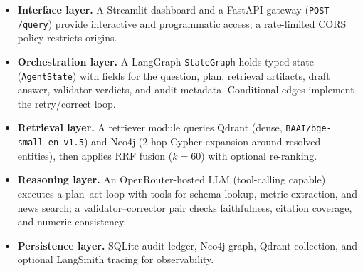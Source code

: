 \documentclass[conference]{IEEEtran}
\begin{document}
\begin{itemize}
\item \textbf{Interface layer.} A Streamlit dashboard and a FastAPI gateway (\texttt{POST /query}) provide interactive and programmatic access; a rate-limited CORS policy restricts origins.
\item \textbf{Orchestration layer.} A LangGraph \texttt{StateGraph} holds typed state (\texttt{AgentState}) with fields for the question, plan, retrieval artifacts, draft answer, validator verdicts, and audit metadata. Conditional edges implement the retry/correct loop.
\item \textbf{Retrieval layer.} A retriever module queries Qdrant (dense, \texttt{BAAI/bge-small-en-v1.5}) and Neo4j (2-hop Cypher expansion around resolved entities), then applies RRF fusion ($k{=}60$) with optional re-ranking.
\item \textbf{Reasoning layer.} An OpenRouter-hosted LLM (tool-calling capable) executes a plan--act loop with tools for schema lookup, metric extraction, and news search; a validator--corrector pair checks faithfulness, citation coverage, and numeric consistency.
\item \textbf{Persistence layer.} SQLite audit ledger, Neo4j graph, Qdrant collection, and optional LangSmith tracing \cite{langsmith} for observability.
\end{itemize}
\end{document}
